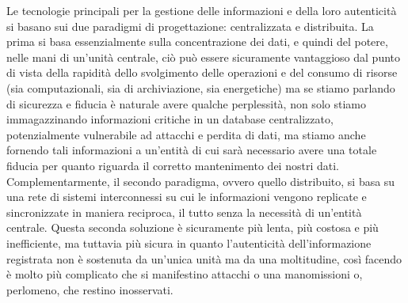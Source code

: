Le tecnologie principali per la gestione delle informazioni e della loro autenticità
si basano sui due paradigmi di progettazione: centralizzata e distribuita.
La prima si basa essenzialmente sulla concentrazione dei dati, e quindi del potere,
nelle mani di un'unità centrale, ciò può essere sicuramente vantaggioso dal punto di
vista della rapidità dello svolgimento delle operazioni e del consumo di risorse
(sia computazionali, sia di archiviazione, sia energetiche) ma se stiamo parlando di
sicurezza e fiducia è naturale avere qualche perplessità, non solo stiamo immagazzinando
informazioni critiche in un database centralizzato, potenzialmente vulnerabile ad attacchi
e perdita di dati, ma stiamo anche fornendo tali informazioni a un'entità di cui sarà
necessario avere una totale fiducia per quanto riguarda il corretto mantenimento dei
nostri dati. \\
Complementarmente, il secondo paradigma, ovvero quello distribuito, si basa
su una rete di sistemi interconnessi su cui le informazioni vengono replicate e sincronizzate
in maniera reciproca, il tutto senza la necessità di un'entità centrale.
Questa seconda soluzione è sicuramente più lenta, più costosa e più inefficiente,
ma tuttavia più sicura in quanto l'autenticità dell'informazione registrata non è sostenuta
da un'unica unità ma da una moltitudine, così facendo è molto più complicato che si
manifestino attacchi o una manomissioni o, perlomeno, che restino inosservati. 

